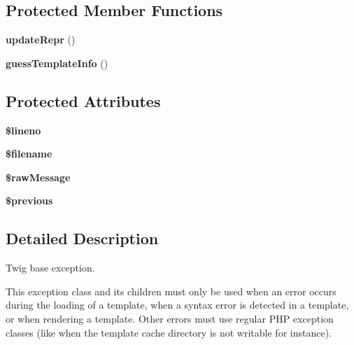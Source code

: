 \subsection*{Protected Member Functions}
\begin{DoxyCompactItemize}
\item 
{\bfseries update\+Repr} ()\hypertarget{classTwig__Error_ac469dac82e31156ed06fb10316f1196a}{}\label{classTwig__Error_ac469dac82e31156ed06fb10316f1196a}

\item 
{\bfseries guess\+Template\+Info} ()\hypertarget{classTwig__Error_a4421ba2d693bb87ff165590136f3616c}{}\label{classTwig__Error_a4421ba2d693bb87ff165590136f3616c}

\end{DoxyCompactItemize}
\subsection*{Protected Attributes}
\begin{DoxyCompactItemize}
\item 
{\bfseries \$lineno}\hypertarget{classTwig__Error_a32592d7811cbb17d6ccd0cbb0740b2bf}{}\label{classTwig__Error_a32592d7811cbb17d6ccd0cbb0740b2bf}

\item 
{\bfseries \$filename}\hypertarget{classTwig__Error_a0173fed93a11934ac7c913b5f379d312}{}\label{classTwig__Error_a0173fed93a11934ac7c913b5f379d312}

\item 
{\bfseries \$raw\+Message}\hypertarget{classTwig__Error_adfa2b3513096b7110fa2abcef7c18efc}{}\label{classTwig__Error_adfa2b3513096b7110fa2abcef7c18efc}

\item 
{\bfseries \$previous}\hypertarget{classTwig__Error_ae3faec7d6daefb52fd037d564d11db4c}{}\label{classTwig__Error_ae3faec7d6daefb52fd037d564d11db4c}

\end{DoxyCompactItemize}


\subsection{Detailed Description}
Twig base exception.

This exception class and its children must only be used when an error occurs during the loading of a template, when a syntax error is detected in a template, or when rendering a template. Other errors must use regular P\+HP exception classes (like when the template cache directory is not writable for instance).

